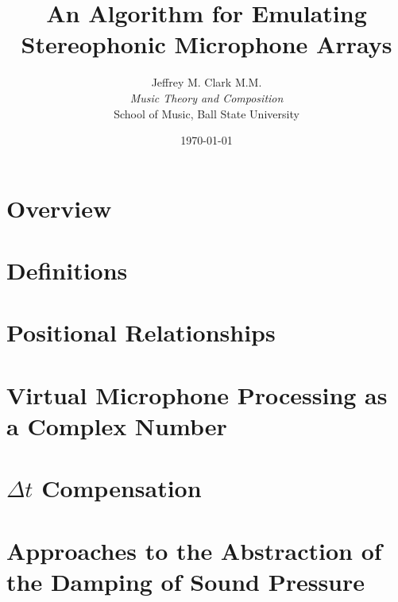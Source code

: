 \documentclass[fleqn, twocolumn]{article}
\title{An Algorithm for Emulating Stereophonic Microphone Arrays}
\date{\today}
\author{Jeffrey M. Clark M.M. \\ \textit{Music Theory and Composition} \\ School of Music,  Ball State University}
\begin{document}
\maketitle

\section{Overview}



\section{Definitions}

\section{Positional Relationships}

\section{Virtual Microphone Processing as a Complex Number}

\section{$\Delta{}t$ Compensation}

\section{Approaches to the Abstraction of the Damping of Sound Pressure}
\end{document}
